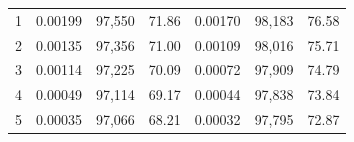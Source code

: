 \begin{tabular}{cccc|ccc}
1    & 0.00199                                                          & 97,550                                                                                            & 71.86                                                                                                                      & 0.00170                                                          & 98,183                                                                                            & 76.58                                                                                                                      \\
2    & 0.00135                                                          & 97,356                                                                                            & 71.00                                                                                                                      & 0.00109                                                          & 98,016                                                                                            & 75.71                                                                                                                      \\
3    & 0.00114                                                          & 97,225                                                                                            & 70.09                                                                                                                      & 0.00072                                                          & 97,909                                                                                            & 74.79                                                                                                                      \\
4    & 0.00049                                                          & 97,114                                                                                            & 69.17                                                                                                                      & 0.00044                                                          & 97,838                                                                                            & 73.84                                                                                                                      \\
5    & 0.00035                                                          & 97,066                                                                                            & 68.21                                                                                                                      & 0.00032                                                          & 97,795                                                                                            & 72.87                                                                                                                      \\

\end{tabular}
